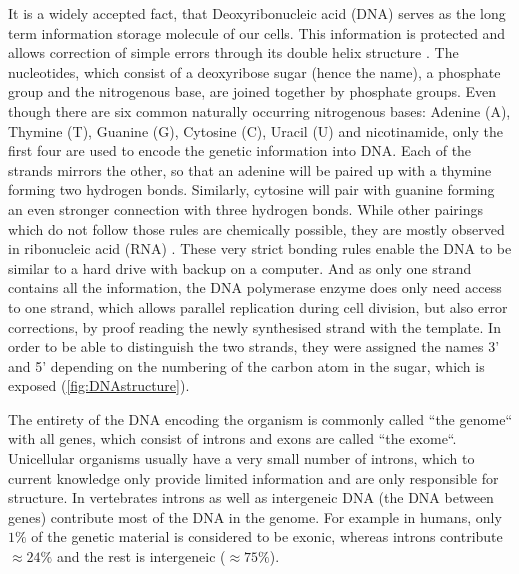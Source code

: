 It is a widely accepted fact, that Deoxyribonucleic acid (DNA) serves as the long term information storage molecule of our cells. This information is protected and allows correction of simple errors through its double helix structure \cite{Watson1953,Liang1998}. The nucleotides, which consist of a deoxyribose sugar (hence the name), a phosphate group and the nitrogenous base, are joined together by phosphate groups. Even though there are six common naturally occurring nitrogenous bases: Adenine (A), Thymine (T), Guanine (G), Cytosine (C), Uracil (U) and nicotinamide, only the first four are used to encode the genetic information into DNA. Each of the strands mirrors the other, so that an adenine will be paired up with a thymine forming two hydrogen bonds. Similarly, cytosine will pair with guanine forming an even stronger connection with three hydrogen bonds. While other pairings which do not follow those rules are chemically possible, they are mostly observed in ribonucleic acid (RNA) \cite{Sinden1994}. These very strict bonding rules enable the DNA to be similar to a hard drive with backup on a computer. And as only one strand contains all the information, the DNA polymerase enzyme does only need access to one strand, which allows parallel replication during cell division, but also error corrections, by proof reading the newly synthesised strand with the template. In order to be able to distinguish the two strands, they were assigned the names 3' and 5' depending on the numbering of the carbon atom in the sugar, which is exposed (\autoref{fig:DNAstructure}).

The entirety of the DNA encoding the organism is commonly called ``the genome`` with all genes, which consist of introns and exons are called ``the exome``. Unicellular organisms usually have a very small number of introns, which to current knowledge only provide limited information and are only responsible for structure. In vertebrates  introns as well as intergeneic DNA (the DNA between genes) contribute most of the DNA in the genome. For example in humans, only $1\%$ of the genetic material is considered to be exonic, whereas introns contribute $\approx 24\%$ and the rest is intergeneic ($\approx 75\%$)\cite{Venter2001}.

